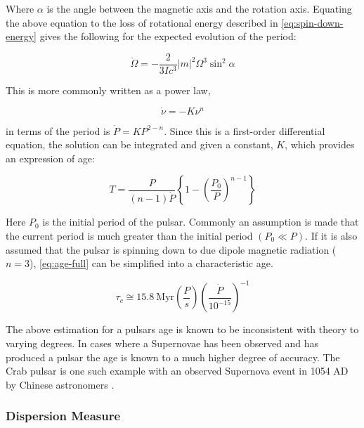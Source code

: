 Where $\alpha$ is the angle between the magnetic axis and the rotation axis. Equating the above equation to the loss of rotational energy described in \cref{eq:spin-down-energy} gives the following for the expected evolution of the period:

\begin{equation}
    \dot \Omega = - \frac{2}{3Ic^3} |m|^2 \Omega^3 \sin^2 \alpha
\end{equation}

This is more commonly written as a power law, 

\begin{equation}
    \dot \nu = -K \nu^n 
    \label{eq:spin-down-power-law}
\end{equation}

 in terms of the period is $\dot P = K P^{2-n}$. Since this is a first-order differential equation, the solution can be integrated and given a constant, $K$, which provides an expression of age:

\begin{equation}
    T = \frac{P}{(n-1)\dot P} \left\{ 1 - \left( \frac{P_0}{P} \right)^{n - 1} \right\} 
    \label{eq:age-full}
\end{equation}

Here $P_0$ is the initial period of the pulsar. Commonly an assumption is made that the current period is much greater than the initial period $(P_0 \ll P)$. If it is also assumed that the pulsar is spinning down to due dipole magnetic radiation ($n=3$), \cref{eq:age-full} can be simplified into a characteristic age. 

\begin{equation}
    \tau_c \cong 15.8~\text{Myr} \left( \frac{P}{s} \right) \left( \frac{\dot P}{10^{-15}} \right)^{-1}
\end{equation}

The above estimation for a pulsars age is known to be inconsistent with theory to varying degrees. In cases where a Supernovae has been observed and has produced a pulsar the age is known to a much higher degree of accuracy. The Crab pulsar is one such example with an observed Supernova event in 1054 AD by Chinese astronomers \citep{kaspi_chandra_2001}. %

\subsubsection{Dispersion Measure} \label{sec:DispersionMeasure}


